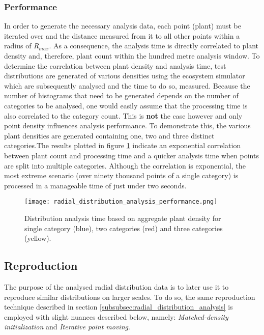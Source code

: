 \subsubsection{Performance} \label{subsubsec:analysis_performance}

In order to generate the necessary analysis data, each point (plant) must be iterated over and the distance measured from it to all other points within a radius of \textit{R$_{max}$}. As a consequence, the analysis time is directly correlated to plant density and, therefore, plant count within the hundred metre analysis window. To determine the correlation between plant density and analysis time, test distributions are generated of various densities using the ecosystem simulator which are subsequently analysed and the time to do so, measured. Because the number of histograms that need to be generated depends on the number of categories to be analysed, one would easily assume that the processing time is also correlated to the category count. This is \textbf{not} the case however and only point density influences analysis performance. To demonstrate this, the various plant densities are generated containing one, two and three distinct categories.The results plotted in figure \ref{fig:analysis_perf} indicate an exponential correlation between plant count and processing time and a quicker analysis time when points are split into multiple categories. Although the correlation is exponential, the most extreme scenario (over ninety thousand points of a single category) is processed in a manageable time of just under two seconds. 

\begin{figure}
\center
	\texttt{[image: radial\_distribution\_analysis\_performance.png]}
	\caption{ Distribution analysis time based on aggregate plant density for single category (blue), two categories (red) and three categories (yellow).}	
	\label{fig:analysis_perf}
\end{figure}

\subsection{Reproduction}

The purpose of the analysed radial distribution data is to later use it to reproduce similar distributions on larger scales. To do so, the same reproduction technique described in section \ref{subsubsec:radial_distribution_analysis} is employed with slight nuances described below, namely: \textit{Matched-density initialization} and \textit{Iterative point moving}.\\

